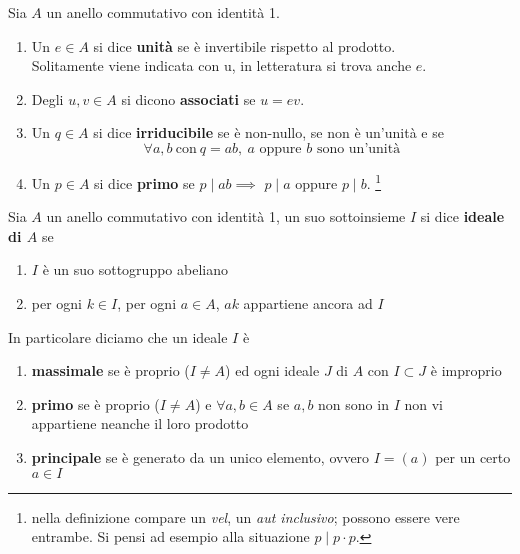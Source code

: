 \begin{definizione}
	Sia $A$ un anello commutativo con identità 1.
	\begin{enumerate}
		\item Un $e \in A$ si dice \textbf{unità} se è invertibile rispetto al prodotto. \\ Solitamente viene indicata con u, in letteratura si trova anche $e$.
		\item Degli $u,v \in A$ si dicono \textbf{associati} se $u=ev$.
		\item Un $q \in A$ si dice \textbf{irriducibile} se è non-nullo, se non è un'unità e se 
		\begin{equation*}
		\forall a,b \ \text{con} \ q=ab, \ \text{$a$ oppure $b$ sono un'unità}
		\end{equation*}
		\item Un $p \in A$ si dice \textbf{primo} se $p\mid ab \implies $ $p\mid a$ oppure $p\mid b$. \footnote{nella definizione compare un \textit{vel}, un \textit{aut inclusivo}; possono essere vere entrambe. Si pensi ad esempio alla situazione $p\mid p\cdot p$.}
	\end{enumerate}
\end{definizione}
\begin{definizione}[Ideale]
	Sia $A$ un anello commutativo con identità 1, un suo sottoinsieme $I$ si dice \textbf{ideale di $A$} se
	\begin{enumerate}
		\item $I$ è un suo sottogruppo abeliano
		\item per ogni $k\in I$, per ogni $a\in A$, $ak$ appartiene ancora ad $I$
	\end{enumerate}
	In particolare diciamo che un ideale $I$ è
	\begin{enumerate}
		\item \textbf{massimale} se è proprio ($I \neq A$) ed ogni ideale $J$ di $A$ con $I \subset J$ è improprio
		\item \textbf{primo} se è proprio ($I \neq A$) e $\forall a,b \in A$ se $a,b$ non sono in $I$ non vi appartiene neanche il loro prodotto
		\item\textbf{principale} se è generato da un unico elemento, ovvero $I=(a)$ per un certo $a \in I$
	\end{enumerate}
\end{definizione}
